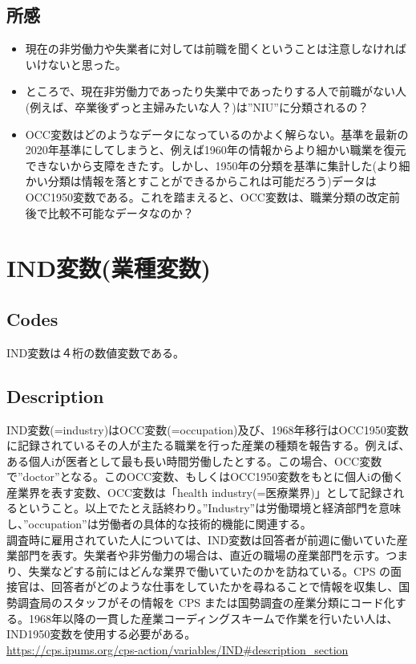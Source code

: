 \documentclass{jsarticle}
\begin{document}
\subsection{所感}
\begin{itemize}
    \item 現在の非労働力や失業者に対しては前職を聞くということは注意しなければいけないと思った。
    \item ところで、現在非労働力であったり失業中であったりする人で前職がない人(例えば、卒業後ずっと主婦みたいな人？)は”NIU”に分類されるの？
    \item OCC変数はどのようなデータになっているのかよく解らない。基準を最新の2020年基準にしてしまうと、例えば1960年の情報からより細かい職業を復元できないから支障をきたす。しかし、1950年の分類を基準に集計した(より細かい分類は情報を落とすことができるからこれは可能だろう)データはOCC1950変数である。これを踏まえると、OCC変数は、職業分類の改定前後で比較不可能なデータなのか？
\end{itemize}

\section{IND変数(業種変数)}

\subsection{Codes}
IND変数は４桁の数値変数である。

\subsection{Description}
IND変数(=industry)はOCC変数(=occupation)及び、1968年移行はOCC1950変数に記録されているその人が主たる職業を行った産業の種類を報告する。例えば、ある個人iが医者として最も長い時間労働したとする。この場合、OCC変数で”doctor”となる。このOCC変数、もしくはOCC1950変数をもとに個人iの働く産業界を表す変数、OCC変数は「health industry(=医療業界)」として記録されるということ。以上でたとえ話終わり。”Industry”は労働環境と経済部門を意味し、”occupation”は労働者の具体的な技術的機能に関連する。\\
  
調査時に雇用されていた人については、IND変数は回答者が前週に働いていた産業部門を表す。失業者や非労働力の場合は、直近の職場の産業部門を示す。つまり、失業などする前にはどんな業界で働いていたのかを訪ねている。CPS の面接官は、回答者がどのような仕事をしていたかを尋ねることで情報を収集し、国勢調査局のスタッフがその情報を CPS または国勢調査の産業分類にコード化する。1968年以降の一貫した産業コーディングスキームで作業を行いたい人は、IND1950変数を使用する必要がある。\\
\url{https://cps.ipums.org/cps-action/variables/IND#description_section}
\end{document}

